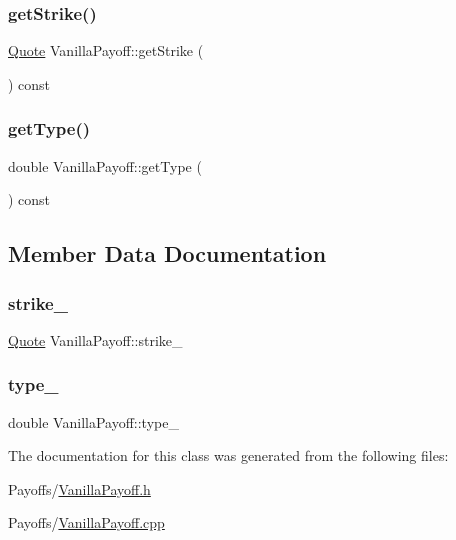 \subsubsection{\texorpdfstring{get\+Strike()}{getStrike()}}
{\footnotesize\ttfamily \hyperlink{_name_def_8h_a642a6c5fd87319d922637de0e0bb0305}{Quote} Vanilla\+Payoff\+::get\+Strike (\begin{DoxyParamCaption}{ }\end{DoxyParamCaption}) const}

\hypertarget{class_vanilla_payoff_ac1b4cc9e4152ed3f7c07c71270fc1831}{}\label{class_vanilla_payoff_ac1b4cc9e4152ed3f7c07c71270fc1831} 
\subsubsection{\texorpdfstring{get\+Type()}{getType()}}
{\footnotesize\ttfamily double Vanilla\+Payoff\+::get\+Type (\begin{DoxyParamCaption}{ }\end{DoxyParamCaption}) const}



\subsection{Member Data Documentation}
\hypertarget{class_vanilla_payoff_a63c2c23fecb9b43cd250e28791a31a56}{}\label{class_vanilla_payoff_a63c2c23fecb9b43cd250e28791a31a56} 
\subsubsection{\texorpdfstring{strike\+\_\+}{strike\_}}
{\footnotesize\ttfamily \hyperlink{_name_def_8h_a642a6c5fd87319d922637de0e0bb0305}{Quote} Vanilla\+Payoff\+::strike\+\_\+\hspace{0.3cm}{\ttfamily [private]}}

\hypertarget{class_vanilla_payoff_a4a09d08187de77df248cc3f7498e3e2f}{}\label{class_vanilla_payoff_a4a09d08187de77df248cc3f7498e3e2f} 
\subsubsection{\texorpdfstring{type\+\_\+}{type\_}}
{\footnotesize\ttfamily double Vanilla\+Payoff\+::type\+\_\+\hspace{0.3cm}{\ttfamily [private]}}



The documentation for this class was generated from the following files\+:\begin{DoxyCompactItemize}
\item 
Payoffs/\hyperlink{_vanilla_payoff_8h}{Vanilla\+Payoff.\+h}\item 
Payoffs/\hyperlink{_vanilla_payoff_8cpp}{Vanilla\+Payoff.\+cpp}\end{DoxyCompactItemize}
